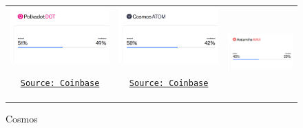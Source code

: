\documentclass[11pt, letterpaper]{article}
\begin{document}
\begin{figure}[H]
\begin{tabular}{ccc}
		\addlinespace[2ex] %

		\begin{minipage}{0.3\textwidth}
			\centering
			\includegraphics[width=0.9\linewidth]{img/polkadot.png}
			\caption*{Polkadot}
			\href{https://www.coinbase.com/earn/staking/polkadot}{\texttt{\scriptsize Source: Coinbase}}
		\end{minipage} &
		\begin{minipage}{0.3\textwidth}
			\centering
			\includegraphics[width=0.9\linewidth]{img/cosmos.png}
			\caption*{Cosmos}
			\href{https://www.coinbase.com/earn/staking/cosmos}{\texttt{\scriptsize Source: Coinbase}}
		\end{minipage}   &
		\begin{minipage}{0.3\textwidth}
			\centering
			\includegraphics[width=0.9\linewidth]{img/avalanche.png}

\end{minipage}
\end{tabular}
\end{figure}
\end{document}
